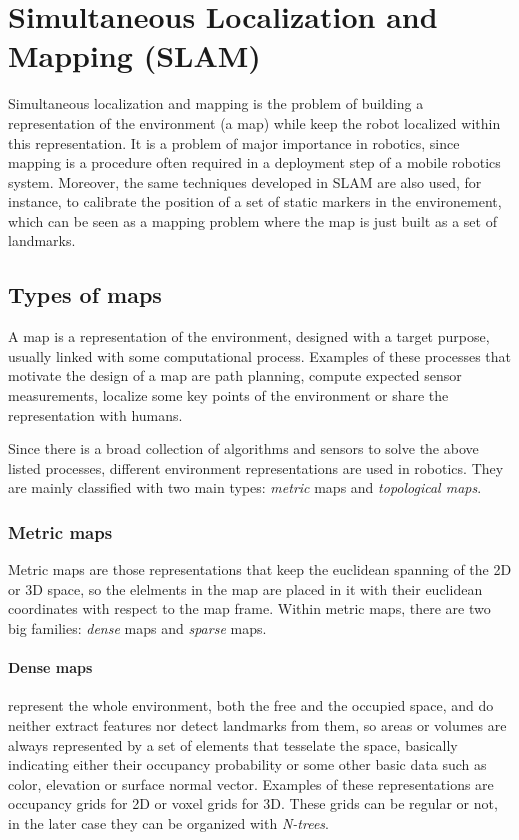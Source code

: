 \section{Simultaneous Localization and Mapping (SLAM)}
\label{sec:slam}
Simultaneous localization and mapping is the problem of building a representation of the environment (a map) while keep the robot localized within this representation. It is a problem of major importance in robotics, since mapping is a procedure often required in a deployment step of a mobile robotics system. Moreover, the same techniques developed in SLAM are also used, for instance, to calibrate the position of a set of static markers in the environement, which can be seen as a mapping problem where the map is just built as a set of landmarks. 

\subsection{Types of maps}
A map is a representation of the environment, designed with a target purpose, usually linked with some computational process. Examples of these processes that motivate the design of a map are path planning, compute expected sensor measurements, localize some key points of the environment or share the representation with humans.

Since there is a broad collection of algorithms and sensors to solve the above listed processes, different environment representations are used in robotics. They are mainly classified with two main types: \textit{metric} maps and \textit{topological maps}. 

\subsubsection{Metric maps} 
Metric maps are those representations that keep the euclidean spanning of the 2D or 3D space, so the elelments in the map are placed in it with their euclidean coordinates with respect to the map frame. Within metric maps, there are two big families: \textit{dense} maps and \textit{sparse} maps.

\paragraph{Dense maps} represent the whole environment, both the free and the occupied space, and do neither extract features nor detect landmarks from them, so areas or volumes are always represented by a set of elements that tesselate the space, basically indicating either their occupancy probability or some other basic data such as color, elevation or surface normal vector. Examples of these representations are occupancy grids for 2D or voxel grids for 3D. These grids can be regular or not, in the later case they can be organized with \textit{N-trees}. 

